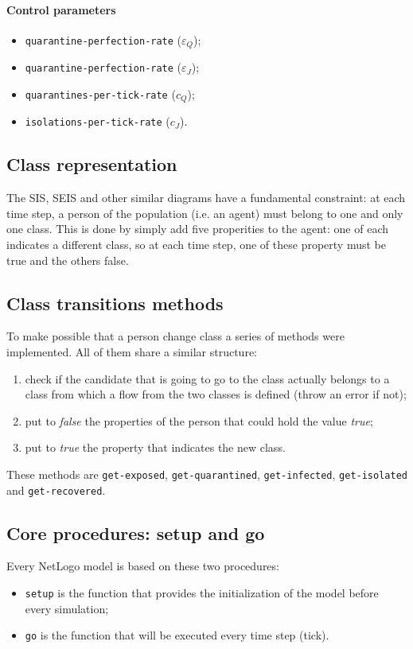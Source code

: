\documentclass[12pt]{llncs}
\begin{document}
\paragraph{Control parameters}
\begin{itemize}
\item \texttt{quarantine-perfection-rate} ($\varepsilon_Q$);
\item \texttt{quarantine-perfection-rate} ($\varepsilon_J$);
\item \texttt{quarantines-per-tick-rate} ($c_Q$);
\item \texttt{isolations-per-tick-rate} ($c_J$).
\end{itemize}

\subsection{Class representation}
The SIS, SEIS and other similar diagrams have a fundamental constraint: at each time step, a person of the population (i.e. an agent) must belong to one and only one class. This is done by simply add five properities to the agent: one of each indicates a different class, so at each time step, one of these property must be true and the others false.

\subsection{Class transitions methods}
To make possible that a person change class a series of methods were implemented. All of them share a similar structure:
\begin{enumerate}
\item check if the candidate that is going to go to the class actually belongs to a class from which a flow from the two classes is defined (throw an error if not);
\item put to \textit{false} the properties of the person that could hold the value \textit{true};
\item put to \textit{true} the property that indicates the new class.
\end{enumerate}
These methods are \texttt{get-exposed}, \texttt{get-quarantined}, \texttt{get-infected}, \texttt{get-isolated} and \texttt{get-recovered}.

\subsection{Core procedures: setup and go}
Every NetLogo model is based on these two procedures:
\begin{itemize}
\item \texttt{setup} is the function that provides the initialization of the model before every simulation;
\item \texttt{go} is the function that will be executed every time step (tick).
\end{itemize}
\end{document}
